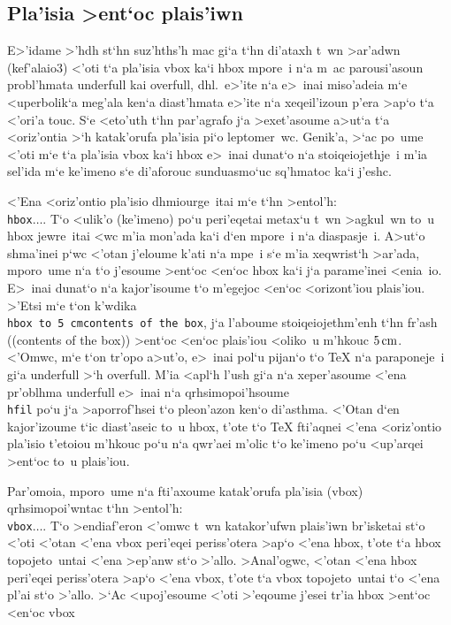 \subsection{Pla'isia >ent`oc plais'iwn}

E>'idame >'hdh st`hn suz'hths'h mac gi`a t`hn di'ataxh t~wn >ar'adwn
(kef'alaio\NB{}3) <'oti t`a pla'isia {\rm vbox} ka`i {\rm hbox} mpore~i
n`a m~ac parousi'asoun probl'hmata {\rm underfull} kai {\rm overfull},
dhl.\ e>'ite n`a e>~inai miso'adeia m`e <uperbolik`a meg'ala ken`a
diast'hmata e>'ite n`a xeqeil'izoun p'era >ap`o t`a <'ori'a touc.
S`e <eto'uth t`hn par'agrafo j`a >exet'asoume a>ut`a t`a <oriz'ontia
>`h katak'orufa pla'isia pi`o le\-pto\-mer~wc.  Genik'a, >`ac po~ume
<'oti m`e t`a pla'isia {\rm vbox} ka`i {\rm hbox} e>~inai dunat`o n`a
stoiqeiojethje~i m'ia sel'ida m`e ke'imeno s`e di'aforouc sunduasmo`uc
sq'hmatoc ka`i j'eshc.

<'Ena <oriz'ontio pla'isio dhmiourge~itai m`e t`hn >entol'h: {\tt
\\hbox\lb $\ldots$\rb}\null.  T`o <ulik'o (ke'imeno) po`u peri'eqetai
metax`u t~wn >agkul~wn to~u {\rm hbox} jewre~itai <wc m'ia mon'ada ka`i
d`en mpore~i n`a dia\-spa\-sje~i.  A>ut`o shma'inei p`wc <'otan j'eloume
k'ati n`a mpe~i s`e m'ia xeqwrist`h >ar'ada, mporo~ume n`a t`o j'esoume
>ent`oc <en`oc {\rm hbox} ka`i j`a parame'inei <enia~io.  E>~inai
dunat`o n`a kajor'isoume t`o m'egejoc <en`oc <orizont'iou
plais'iou.  >'Etsi m`e t`on k'wdika {\tt \\hbox to 5
cm\lb contents of the box\rb}, j`a l'aboume stoiqeiojethm'enh t`hn
fr'ash (({\rm contents of the box})) >ent`oc <en`oc  plais'iou <oliko~u
m'hkouc $5\,\rm cm$.  <'Omwc, m`e t`on tr'opo a>ut'o, e>~inai pol`u
pijan`o t`o {\rm \TeX} n`a paraponeje~i gi`a {\rm underfull} >`h {\rm
overfull}.  M'ia <apl`h l'ush gi`a n`a xeper'asoume <'ena pr'oblhma {\rm
underfull} e>~inai n`a qrhsimopoi'hsoume {\tt\\hfil} po`u j`a
>aporrof'hsei t`o pleon'azon ken`o di'asthma.  <'Otan d`en kajor'izoume
t`ic diast'aseic to~u {\rm hbox}, t'ote t`o {\rm\TeX} fti'aqnei <'ena
<oriz'ontio pla'isio t'etoiou m'hkouc po`u n`a qwr'aei m'olic t`o
ke'imeno po`u <up'arqei >ent`oc to~u plais'iou.    

Par'omoia, mporo~ume n`a fti'axoume katak'orufa pla'isia ({\rm vbox})
qrhsimopoi'wntac t`hn >entol'h: {\tt \\vbox\lb $\ldots$\rb}.  T`o
>endiaf'eron <'omwc t~wn katakor'ufwn plais'iwn br'isketai st`o <'oti
<'otan <'ena {\rm vbox} peri'eqei periss'otera >ap`o <'ena {\rm hbox},
t'ote t`a {\rm hbox} topojeto~untai <'ena >ep'anw st`o >'allo. 
>Anal'ogwc, <'otan <'ena {\rm hbox} peri'eqei periss'otera >ap`o <'ena
{\rm vbox}, t'ote t`a {\rm vbox} topojeto~untai t`o <'ena pl'ai st`o
>'allo.  >`Ac <upoj'esoume <'oti >'eqoume j'esei tr'ia {\rm hbox} >ent`oc
<en`oc {\rm vbox}


